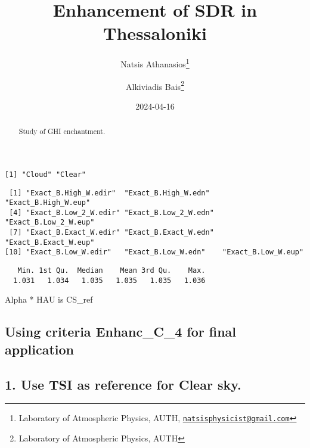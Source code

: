 \documentclass[
  10pt,
  a4paper,oneside]{article}
\title{Enhancement of SDR in Thessaloniki}
\author{Natsis Athanasios\footnote{Laboratory of Atmospheric Physics, AUTH, \href{mailto:natsisphysicist@gmail.com}{\nolinkurl{natsisphysicist@gmail.com}}} \and Alkiviadis Bais\footnote{Laboratory of Atmospheric Physics, AUTH}}
\date{2024-04-16}
\begin{document}
\maketitle
\begin{abstract}
Study of GHI enchantment.
\end{abstract}

{
\hypersetup{linkcolor=}
\setcounter{tocdepth}{4}
\tableofcontents
}
\begin{verbatim}
[1] "Cloud" "Clear"
\end{verbatim}

\begin{verbatim}
 [1] "Exact_B.High_W.edir"  "Exact_B.High_W.edn"   "Exact_B.High_W.eup"  
 [4] "Exact_B.Low_2_W.edir" "Exact_B.Low_2_W.edn"  "Exact_B.Low_2_W.eup" 
 [7] "Exact_B.Exact_W.edir" "Exact_B.Exact_W.edn"  "Exact_B.Exact_W.eup" 
[10] "Exact_B.Low_W.edir"   "Exact_B.Low_W.edn"    "Exact_B.Low_W.eup"   
\end{verbatim}

\begin{verbatim}
   Min. 1st Qu.  Median    Mean 3rd Qu.    Max. 
  1.031   1.034   1.035   1.035   1.035   1.036 
\end{verbatim}

Alpha * HAU is CS\_ref

\hypertarget{using-criteria-enhanc_c_4-for-final-application}{%
\subsection{\texorpdfstring{Using criteria \textbf{Enhanc\_C\_4} for final application}{Using criteria Enhanc\_C\_4 for final application}}\label{using-criteria-enhanc_c_4-for-final-application}}

\hypertarget{use-tsi-as-reference-for-clear-sky.}{%
\subsection{1. Use TSI as reference for Clear sky.}\label{use-tsi-as-reference-for-clear-sky.}}
\end{document}
